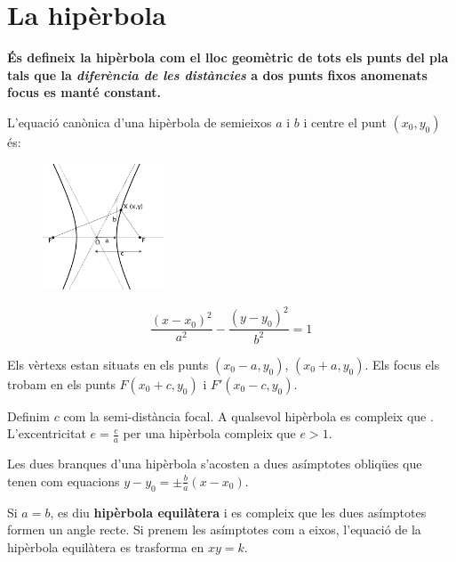 \section{La hipèrbola}
\begin{theorybox}
	\textbf{És defineix la hipèrbola com el lloc geomètric de tots els punts del pla
	tals que la \textit{diferència de les distàncies} a dos punts fixos anomenats focus es manté constant.}
	
	L'equació canònica d'una hipèrbola de semieixos $a$ i $b$ i centre el punt $(x_0, y_0)$ és:
		\begin{figure} 
		\vspace{-1cm}
		\begin{center}
			\includegraphics[width=0.32\textwidth]{img-10/hiperb2}
		\end{center}
			\vspace{-1cm}
	\end{figure}
	\begin{equation}
	\label{eq:hiperbola-canonica}
	\frac{(x-x_0)^2}{a^2}-\frac{(y-y_0)^2}{b^2}=1
	\end{equation} 
	
	Els vèrtexs estan situats en els punts $(x_0-a, y_0)$, $(x_0+a, y_0)$. Els focus els trobam en els punts $F(x_0+c, y_0)$ i $F'(x_0-c,y_0)$.
	
	Definim $c$ com la semi-distància focal. A qualsevol hipèrbola es compleix que  . L'excentricitat $e=\frac{c}{a}$ per una hipèrbola compleix que $e>1$. 
	
	
	
	Les dues branques d'una hipèrbola s'acosten a dues asímptotes obliqües que tenen com equacions \newline $y-y_0=\pm \frac{b}{a} (x-x_0)$. 
	
	Si $a=b$, es diu \textbf{hipèrbola equilàtera} i es compleix que les dues asímptotes formen un angle recte. Si prenem les asímptotes com a eixos, l'equació de la hipèrbola equilàtera es trasforma en $xy=k$.
\end{theorybox}
\pagebreak

